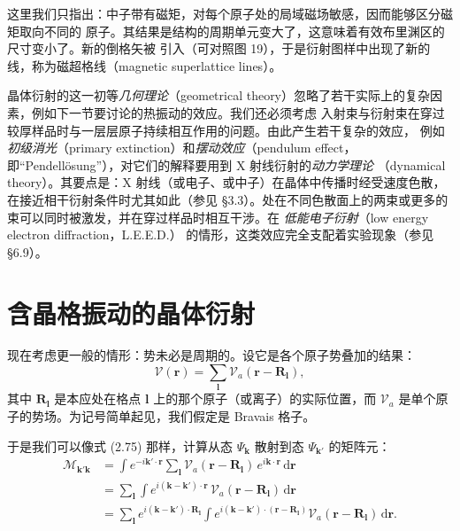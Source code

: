 这里我们只指出：中子带有磁矩，对每个原子处的局域磁场敏感，因而能够区分磁矩取向不同的
原子。其结果是结构的周期单元变大了，这意味着有效布里渊区的尺寸变小了。新的倒格矢被
引入（可对照图 19），于是衍射图样中出现了新的线，称为磁超格线（magnetic
superlattice lines）。

晶体衍射的这一初等\emph{几何理论}（geometrical
theory）忽略了若干实际上的复杂因素，例如下一节要讨论的热振动的效应。我们还必须考虑
入射束与衍射束在穿过较厚样品时与一层层原子持续相互作用的问题。由此产生若干复杂的效应，
例如\emph{初级消光}（primary extinction）和\emph{摆动效应}（pendulum
effect，即“Pendellösung”），对它们的解释要用到 X 射线衍射的\emph{动力学理论}
（dynamical theory）。其要点是：X
射线（或电子、或中子）在晶体中传播时经受速度色散，在接近相干衍射条件时尤其如此（参见
§3.3）。处在不同色散面上的两束或更多的束可以同时被激发，并在穿过样品时相互干涉。在
\emph{低能电子衍射}（low energy electron diffraction，L.E.E.D.）
的情形，这类效应完全支配着实验现象（参见 §6.9）。

\section{含晶格振动的晶体衍射}

现在考虑更一般的情形：势未必是周期的。设它是各个原子势叠加的结果：
\begin{equation*}
\mathcal{V}(\mathbf{r}) = \sum_{\boldsymbol{l}} \mathcal{V}_a(\mathbf{r} - \mathbf{R}_{\boldsymbol{l}}),
\tag{2.83}
\end{equation*}
其中 $\mathbf{R}_{\boldsymbol{l}}$
是本应处在格点 $\boldsymbol{l}$ 上的那个原子（或离子）的实际位置，而
$\mathcal{V}_a$ 是单个原子的势场。为记号简单起见，我们假定是 Bravais 格子。

于是我们可以像式 (2.75) 那样，计算从态 $\Psi_{\mathbf{k}}$ 散射到态
$\Psi_{\mathbf{k}'}$ 的矩阵元：
\begin{align*}
\mathcal{M}_{\mathbf{k}'\mathbf{k}}
&= \int e^{-i\mathbf{k}'\cdot\mathbf{r}} \sum_{\boldsymbol{l}}
\mathcal{V}_a(\mathbf{r} - \mathbf{R}_{\boldsymbol{l}})\,
e^{i\mathbf{k}\cdot\mathbf{r}}\, \mathrm{d}\mathbf{r} \\
&= \sum_{\boldsymbol{l}} \int e^{i(\mathbf{k}-\mathbf{k}')\cdot\mathbf{r}}\,
\mathcal{V}_a(\mathbf{r} - \mathbf{R}_{\boldsymbol{l}})\, \mathrm{d}\mathbf{r} \\
&= \sum_{\boldsymbol{l}} e^{i(\mathbf{k}-\mathbf{k}')\cdot\mathbf{R}_{\boldsymbol{l}}}
\int e^{i(\mathbf{k}-\mathbf{k}')\cdot(\mathbf{r}-\mathbf{R}_{\boldsymbol{l}})}
\mathcal{V}_a(\mathbf{r} - \mathbf{R}_{\boldsymbol{l}})\, \mathrm{d}\mathbf{r}.
\tag{2.84}
\end{align*}

